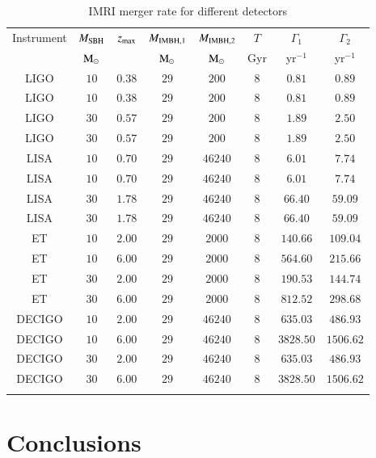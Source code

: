 \documentclass[article]{aa}
\newcommand{\Ms}{{\rm M}_\odot}
\newcommand{\ibh}{{\rm IMBH}}
\begin{document}
\begin{table}
\caption{IMRI merger rate for different detectors }
\begin{center}
\begin{tabular}{cccccccc}
\hline
Instrument & $M_{\rm SBH}$ & $z_{\rm max}$ & $M_{\ibh ,1}$ & $M_{\ibh ,2}$ & $T$ & $\Gamma_1$ & $\Gamma_2$ \\
   & $\Ms$ & &$\Ms$ & $\Ms$ & Gyr & yr$^{-1}$ & yr$^{-1}$ \\ 
\hline
LIGO & $10$ & $0.38$ & $29$ & $200$ & $8$ & $0.81$ &$0.89$ \\
LIGO & $10$ & $0.38$ & $29$ & $200$ & $8$ & $0.81$ &$0.89$ \\
LIGO & $30$ & $0.57$ & $29$ & $200$ & $8$ & $1.89$ &$2.50$ \\
LIGO & $30$ & $0.57$ & $29$ & $200$ & $8$ & $1.89$ &$2.50$ \\
LISA & $10$ & $0.70$ & $29$ & $46240$ & $8$ & $6.01$ &$7.74$ \\
LISA & $10$ & $0.70$ & $29$ & $46240$ & $8$ & $6.01$ &$7.74$ \\
LISA & $30$ & $1.78$ & $29$ & $46240$ & $8$ & $66.40$ &$59.09$ \\
LISA & $30$ & $1.78$ & $29$ & $46240$ & $8$ & $66.40$ &$59.09$ \\
ET & $10$ & $2.00$ & $29$ & $2000$ & $8$ & $140.66$ &$109.04$ \\
ET & $10$ & $6.00$ & $29$ & $2000$ & $8$ & $564.60$ &$215.66$ \\
ET & $30$ & $2.00$ & $29$ & $2000$ & $8$ & $190.53$ &$144.74$ \\
ET & $30$ & $6.00$ & $29$ & $2000$ & $8$ & $812.52$ &$298.68$ \\
DECIGO & $10$ & $2.00$ & $29$ & $46240$ & $8$ & $635.03$ &$486.93$ \\
DECIGO & $10$ & $6.00$ & $29$ & $46240$ & $8$ & $3828.50$ &$1506.62$ \\
DECIGO & $30$ & $2.00$ & $29$ & $46240$ & $8$ & $635.03$ &$486.93$ \\
DECIGO & $30$ & $6.00$ & $29$ & $46240$ & $8$ & $3828.50$ &$1506.62$ \\
\hline
\label{tab:5}
\end{tabular}
\end{center}
\end{table}








\section{Conclusions}
\label{end}
\end{document}
